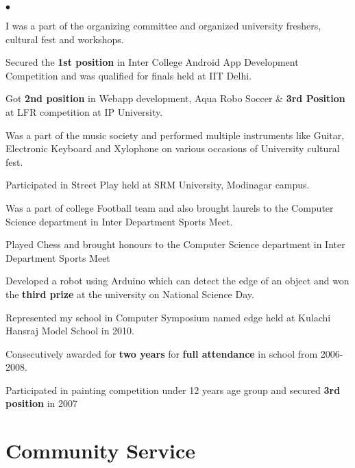 \documentclass[margin,line]{res}
\newenvironment{list2}{
  \begin{list}{$\bullet$}{%
      \setlength{\itemsep}{0in}
      \setlength{\parsep}{0in} \setlength{\parskip}{0in}
      \setlength{\topsep}{0in} \setlength{\partopsep}{0in}
      \setlength{\leftmargin}{0.2in}}}{\end{list}}
\begin{document}
\begin{resume}
\begin{list2}
\item I was a part of the organizing committee and organized university freshers, cultural fest and workshops.
\item Secured the {\bf 1st position} in Inter College Android App Development Competition and was qualified for finals held at IIT Delhi.
\item Got {\bf 2nd position} in Webapp development, Aqua Robo Soccer \& {\bf 3rd Position } at LFR competition at IP University.
\item Was a part of the music society and performed multiple instruments like Guitar, Electronic Keyboard and Xylophone on various occasions of University cultural fest.
\item Participated in Street Play held at SRM University, Modinagar campus.
\item Was a part of college Football team and also brought laurels to the Computer Science department in Inter Department Sports Meet.
\item Played Chess and brought honours to the Computer Science department in Inter Department Sports Meet
\item Developed a robot using Arduino which can detect the edge of an object and won the {\bf third prize} at the university on National Science Day.
\item Represented my school in Computer Symposium named edge held at Kulachi Hansraj Model School in 2010.
\item Consecutively awarded for {\bf two years} for {\bf full attendance} in school from 2006-2008.
\item Participated in painting competition under 12 years age group and secured {\bf 3rd position } in 2007
\end{list2}

\section{\sc Community Service}


\end{resume}
\end{document}
